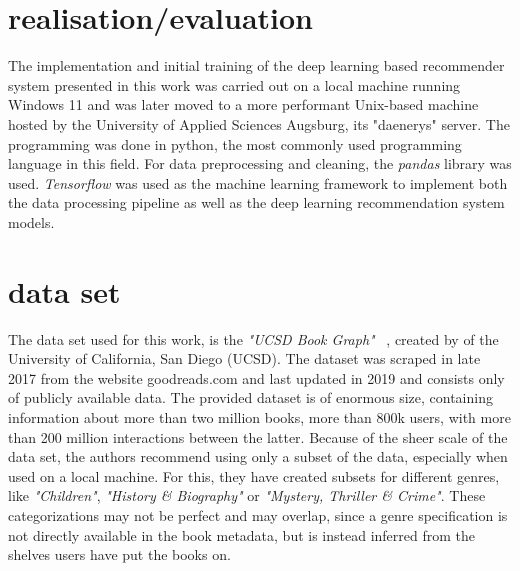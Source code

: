 \documentclass[10pt,final,journal,a4paper,oneside,twocolumn]{IEEEtran}
\begin{document}
\section{realisation/evaluation}
The implementation and initial training of the deep learning based recommender system presented in this work was carried out on a local machine running Windows 11 and was later moved to a more performant Unix-based machine hosted by the University of Applied Sciences Augsburg, its "daenerys" server.
The programming was done in python, the most commonly used programming language in this field. For data preprocessing and cleaning, the \emph{pandas} library was used.
\emph{Tensorflow} was used as the machine learning framework to implement both the data processing pipeline as well as the deep learning recommendation system models.


\section{data set}
The data set used for this work, is the \emph{"UCSD Book Graph"} \cite{Wan.2018}~\cite{Wan.2019}, created by \citeauthor{Wan.2018} of the University of California, San Diego (UCSD). The dataset was scraped in late 2017 from the website goodreads.com and last updated in 2019 and consists only of publicly available data. The provided dataset is of enormous size, containing information about more than two million books, more than 800k users, with more than 200 million interactions between the latter.
Because of the sheer scale of the data set, the authors recommend using only a subset of the data, especially when used on a local machine. For this, they have created subsets for different genres, like \emph{"Children"}, \emph{"History \& Biography"} or \emph{"Mystery, Thriller \& Crime"}. These categorizations may not be perfect and may overlap, since a genre specification is not directly available in the book metadata, but is instead inferred from the shelves users have put the books on.
\end{document}
